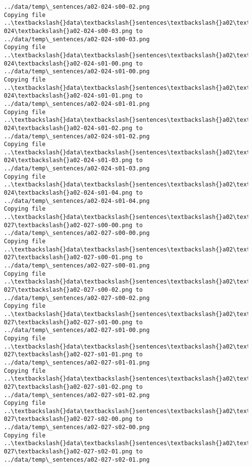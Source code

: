 \documentclass[11pt]{article}
\begin{document}
\begin{Verbatim}[commandchars=\\\{\}]
../data/temp\_sentences/a02-024-s00-02.png
Copying file ..\textbackslash{}data\textbackslash{}sentences\textbackslash{}a02\textbackslash{}a02-024\textbackslash{}a02-024-s00-03.png to
../data/temp\_sentences/a02-024-s00-03.png
Copying file ..\textbackslash{}data\textbackslash{}sentences\textbackslash{}a02\textbackslash{}a02-024\textbackslash{}a02-024-s01-00.png to
../data/temp\_sentences/a02-024-s01-00.png
Copying file ..\textbackslash{}data\textbackslash{}sentences\textbackslash{}a02\textbackslash{}a02-024\textbackslash{}a02-024-s01-01.png to
../data/temp\_sentences/a02-024-s01-01.png
Copying file ..\textbackslash{}data\textbackslash{}sentences\textbackslash{}a02\textbackslash{}a02-024\textbackslash{}a02-024-s01-02.png to
../data/temp\_sentences/a02-024-s01-02.png
Copying file ..\textbackslash{}data\textbackslash{}sentences\textbackslash{}a02\textbackslash{}a02-024\textbackslash{}a02-024-s01-03.png to
../data/temp\_sentences/a02-024-s01-03.png
Copying file ..\textbackslash{}data\textbackslash{}sentences\textbackslash{}a02\textbackslash{}a02-024\textbackslash{}a02-024-s01-04.png to
../data/temp\_sentences/a02-024-s01-04.png
Copying file ..\textbackslash{}data\textbackslash{}sentences\textbackslash{}a02\textbackslash{}a02-027\textbackslash{}a02-027-s00-00.png to
../data/temp\_sentences/a02-027-s00-00.png
Copying file ..\textbackslash{}data\textbackslash{}sentences\textbackslash{}a02\textbackslash{}a02-027\textbackslash{}a02-027-s00-01.png to
../data/temp\_sentences/a02-027-s00-01.png
Copying file ..\textbackslash{}data\textbackslash{}sentences\textbackslash{}a02\textbackslash{}a02-027\textbackslash{}a02-027-s00-02.png to
../data/temp\_sentences/a02-027-s00-02.png
Copying file ..\textbackslash{}data\textbackslash{}sentences\textbackslash{}a02\textbackslash{}a02-027\textbackslash{}a02-027-s01-00.png to
../data/temp\_sentences/a02-027-s01-00.png
Copying file ..\textbackslash{}data\textbackslash{}sentences\textbackslash{}a02\textbackslash{}a02-027\textbackslash{}a02-027-s01-01.png to
../data/temp\_sentences/a02-027-s01-01.png
Copying file ..\textbackslash{}data\textbackslash{}sentences\textbackslash{}a02\textbackslash{}a02-027\textbackslash{}a02-027-s01-02.png to
../data/temp\_sentences/a02-027-s01-02.png
Copying file ..\textbackslash{}data\textbackslash{}sentences\textbackslash{}a02\textbackslash{}a02-027\textbackslash{}a02-027-s02-00.png to
../data/temp\_sentences/a02-027-s02-00.png
Copying file ..\textbackslash{}data\textbackslash{}sentences\textbackslash{}a02\textbackslash{}a02-027\textbackslash{}a02-027-s02-01.png to
../data/temp\_sentences/a02-027-s02-01.png

\end{Verbatim}
\end{document}
